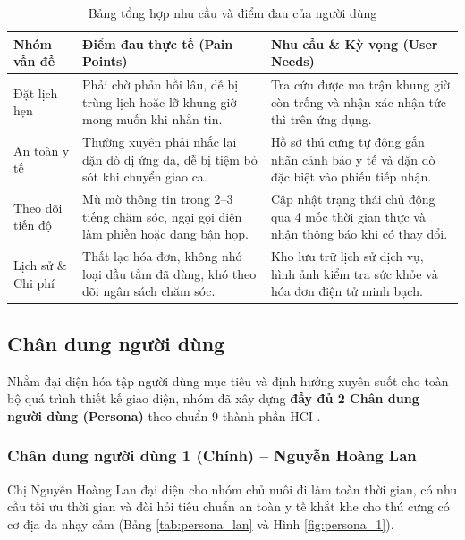 \begin{table}[H]
\centering
\small
\begin{tabularx}{\textwidth}{|l|X|X|}
\hline
\textbf{Nhóm vấn đề} & \textbf{Điểm đau thực tế (Pain Points)} & \textbf{Nhu cầu \& Kỳ vọng (User Needs)} \\ \hline
Đặt lịch hẹn & Phải chờ phản hồi lâu, dễ bị trùng lịch hoặc lỡ khung giờ mong muốn khi nhắn tin. & Tra cứu được ma trận khung giờ còn trống và nhận xác nhận tức thì trên ứng dụng. \\ \hline
An toàn y tế & Thường xuyên phải nhắc lại dặn dò dị ứng da, dễ bị tiệm bỏ sót khi chuyển giao ca. & Hồ sơ thú cưng tự động gắn nhãn cảnh báo y tế và dặn dò đặc biệt vào phiếu tiếp nhận. \\ \hline
Theo dõi tiến độ & Mù mờ thông tin trong 2--3 tiếng chăm sóc, ngại gọi điện làm phiền hoặc đang bận họp. & Cập nhật trạng thái chủ động qua 4 mốc thời gian thực và nhận thông báo khi có thay đổi. \\ \hline
Lịch sử \& Chi phí & Thất lạc hóa đơn, không nhớ loại dầu tắm đã dùng, khó theo dõi ngân sách chăm sóc. & Kho lưu trữ lịch sử dịch vụ, hình ảnh kiểm tra sức khỏe và hóa đơn điện tử minh bạch. \\ \hline
\end{tabularx}
\caption{Bảng tổng hợp nhu cầu và điểm đau của người dùng}
\label{tab:needs_painpoints}
\end{table}

\subsection{Chân dung người dùng}
Nhằm đại diện hóa tập người dùng mục tiêu và định hướng xuyên suốt cho toàn bộ quá trình thiết kế giao diện, nhóm đã xây dựng \textbf{đầy đủ 2 Chân dung người dùng (Persona)} theo chuẩn 9 thành phần HCI \cite{cooper2014aboutface}.

\subsubsection{Chân dung người dùng 1 (Chính) -- Nguyễn Hoàng Lan}
Chị Nguyễn Hoàng Lan đại diện cho nhóm chủ nuôi đi làm toàn thời gian, có nhu cầu tối ưu thời gian và đòi hỏi tiêu chuẩn an toàn y tế khắt khe cho thú cưng có cơ địa da nhạy cảm (Bảng \ref{tab:persona_lan} và Hình \ref{fig:persona_1}).

